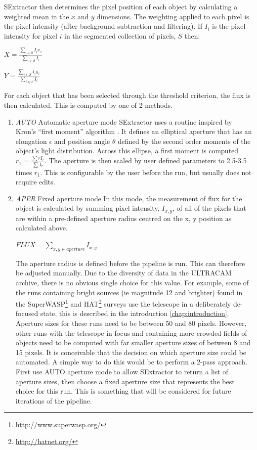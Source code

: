 SExtractor then determines the pixel position of each object by calculating a weighted mean in the $x$ and $y$ dimensions. The weighting applied to each pixel is the pixel intensity (after background subtraction and filtering). If $I_{i}$ is the pixel intensity for pixel $i$ in the segmented collection of pixels, $S$ then:

$ X = \frac{\sum\limits_{i \in S} I_{i}x_{i}}{\sum\limits_{i \in S} I_i}$

$ Y = \frac{\sum\limits_{i \in S} I_{i}y_{i}}{\sum\limits_{i \in S} I_i}$

For each object that has been selected through the threshold criterion, the flux is then calculated. This is computed by one of 2 methods. 

\begin{enumerate}
  \item \emph{AUTO} Automatic aperture mode
SExtractor uses a routine inspired by Kron's ``first moment'' algorithm \cite{kron}. It defines an elliptical aperture that has an elongation $\epsilon$ and position angle $\theta$ defined by the second order moments of the object's light distribution. Across this ellipse, a first moment is computed $r_1 = \frac{\sum r I_r}{\sum{I_r}}$. The aperture is then scaled by user defined parameters to 2.5-3.5 times $r_1$. This is configurable by the user before the run, but usually does not require edits. 

  \item \emph{APER} Fixed aperture mode 
In this mode, the measurement of flux for the object is calculated by summing pixel intensity, $I_{x,y}$,  of all of the pixels that are within a pre-defined aperture radius centred on the x, y position as calculated above. 

$FLUX = \sum\limits_{x,y \in aperture}I_{x,y} $

The aperture radius is defined before the pipeline is run. This can therefore be adjusted manually. Due to the diversity of data in the ULTRACAM archive, there is no obvious single choice for this value. For example, some of the runs containing bright sources (ie magnitude 12 and brighter) found in the {SuperWASP}\footnote{\url{http://www.superwasp.org/}} and {HAT}\footnote{\url{http://hatnet.org/}} surveys use the telescope in a deliberately de-focused state, this is described in the introduction \ref{chap:introduction}. Aperture sizes for these runs need to be between 50 and 80 pixels. However, other runs with the telescope in focus and containing more crowded fields of objects need to be computed with far smaller aperture sizes of between 8 and 15 pixels. It is conceivable that the decision on which aperture size could be automated. A simple way to do this would be to perform a 2-pass approach. First use AUTO aperture mode to allow SExtractor to return a list of aperture sizes, then choose a fixed aperture size that represents the best choice for this run. This is something that will be considered for future iterations of the pipeline. 


\end{enumerate}
